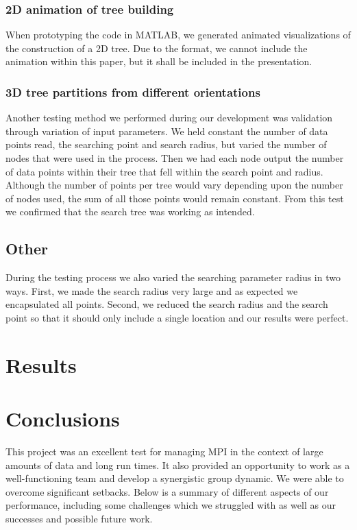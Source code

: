 \documentclass{article}
\begin{document}
\subsubsection{2D animation of tree building}
When prototyping the code in MATLAB, we generated animated visualizations of the construction of a 2D tree. Due to the format, we cannot include the animation within this paper, but it shall be included in the presentation.


\subsubsection{3D tree partitions from different orientations}
Another testing method we performed during our development was validation through variation of input parameters. We held constant the number of data points read, the searching point and search radius, but varied the number of nodes that were used in the process. Then we had each node output the number of data points within their tree that fell within the search point and radius. Although the number of points per tree would vary depending upon the number of nodes used, the sum of all those points would remain constant. From this test we confirmed that the search tree was working as intended. 

\subsection{Other}
During the testing process we also varied the searching parameter radius in two ways. First, we made the search radius very large and as expected we encapsulated all points. Second, we reduced the search radius and the search point so that it should only include a single location and our results were perfect. 

%
%

\section{Results}






\section{Conclusions}
This project was an excellent test for managing MPI in the context of large amounts of data and long run times. It also provided an opportunity to work as a well-functioning team and develop a synergistic group dynamic. We were able to overcome significant setbacks. Below is a summary of different aspects of our performance, including some challenges which we struggled with as well as our successes and possible future work.
\end{document}
